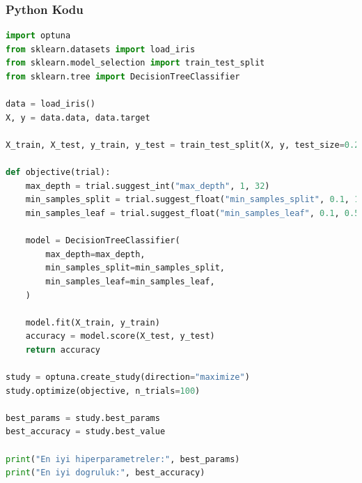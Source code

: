\subsubsection{Python Kodu}

\begin{lstlisting}[language=Python]
import optuna
from sklearn.datasets import load_iris
from sklearn.model_selection import train_test_split
from sklearn.tree import DecisionTreeClassifier

data = load_iris()
X, y = data.data, data.target

X_train, X_test, y_train, y_test = train_test_split(X, y, test_size=0.2, random_state=42)

def objective(trial):
    max_depth = trial.suggest_int("max_depth", 1, 32)
    min_samples_split = trial.suggest_float("min_samples_split", 0.1, 1.0)
    min_samples_leaf = trial.suggest_float("min_samples_leaf", 0.1, 0.5)

    model = DecisionTreeClassifier(
        max_depth=max_depth,
        min_samples_split=min_samples_split,
        min_samples_leaf=min_samples_leaf,
    )

    model.fit(X_train, y_train)
    accuracy = model.score(X_test, y_test)
    return accuracy

study = optuna.create_study(direction="maximize")
study.optimize(objective, n_trials=100)

best_params = study.best_params
best_accuracy = study.best_value

print("En iyi hiperparametreler:", best_params)
print("En iyi dogruluk:", best_accuracy)
\end{lstlisting}

\newpage